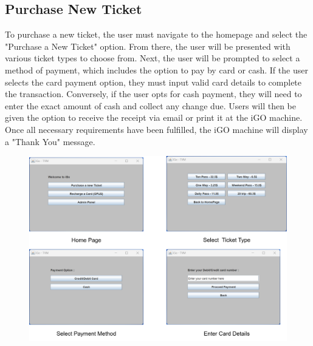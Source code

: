 \documentclass[a4paper, 11pt]{report}
\begin{document}
\subsection{Purchase New Ticket}
To purchase a new ticket, the user must navigate to the homepage and select the "Purchase a New Ticket" option. From there, the user will be presented with various ticket types to choose from. Next, the user will be prompted to select a method of payment, which includes the option to pay by card or cash. If the user selects the card payment option, they must input valid card details to complete the transaction. Conversely, if the user opts for cash payment, they will need to enter the exact amount of cash and collect any change due. Users will then be given the option to receive the receipt via email or print it at the iGO machine. Once all necessary requirements have been fulfilled, the iGO machine will display a "Thank You" message.\\
\begin{figure}[ht]
\centering
   \includegraphics[width=14cm]{1.1.png} 
\end{figure}
\end{document}
